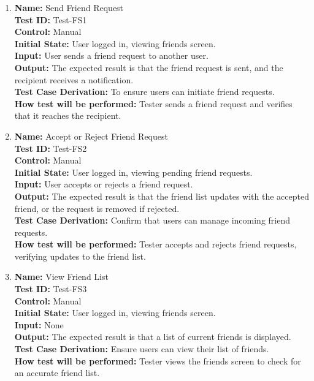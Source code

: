 \documentclass[12pt, titlepage]{article}
\begin{document}
\begin{enumerate}

  \item \textbf{Name:} {Send Friend Request} \label{itm:Test-FS1}\\
        \textbf{Test ID:} Test-FS1\\
        \textbf{Control:} Manual \\
        \textbf{Initial State:} User logged in, viewing friends screen. \\
        \textbf{Input:} User sends a friend request to another user. \\
        \textbf{Output:} The expected result is that the friend request is sent, and the recipient receives a notification. \\
        \textbf{Test Case Derivation:} To ensure users can initiate friend requests. \\
        \textbf{How test will be performed:} Tester sends a friend request and verifies that it reaches the recipient.

  \item \textbf{Name:} {Accept or Reject Friend Request} \label{itm:Test-FS2}\\
        \textbf{Test ID:} Test-FS2\\
        \textbf{Control:} Manual \\
        \textbf{Initial State:} User logged in, viewing pending friend requests. \\
        \textbf{Input:} User accepts or rejects a friend request. \\
        \textbf{Output:} The expected result is that the friend list updates with the accepted friend, or the request is removed if rejected. \\
        \textbf{Test Case Derivation:} Confirm that users can manage incoming friend requests. \\
        \textbf{How test will be performed:} Tester accepts and rejects friend requests, verifying updates to the friend list.

  \item \textbf{Name:} {View Friend List} \label{itm:Test-FS3}\\
        \textbf{Test ID:} Test-FS3\\
        \textbf{Control:} Manual \\
        \textbf{Initial State:} User logged in, viewing friends screen. \\
        \textbf{Input:} None \\
        \textbf{Output:} The expected result is that a list of current friends is displayed. \\
        \textbf{Test Case Derivation:} Ensure users can view their list of friends. \\
        \textbf{How test will be performed:} Tester views the friends screen to check for an accurate friend list.


\end{enumerate}
\end{document}
